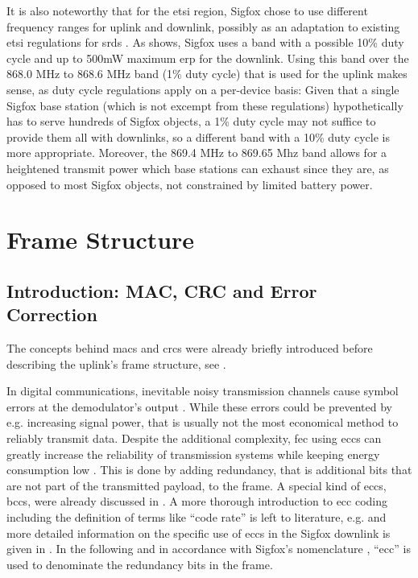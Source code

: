 It is also noteworthy that for the \gls{etsi} region, Sigfox chose to use different frequency ranges for uplink and downlink, possibly as an adaptation to existing \gls{etsi} regulations for \glspl{srd} \cite{bnetza_srd}.
As  shows, Sigfox uses a band with a possible 10\% duty cycle and up to 500mW maximum \gls{erp} for the downlink.
Using this band over the 868.0 MHz to 868.6 MHz band (1\% duty cycle) that is used for the uplink makes sense, as duty cycle regulations apply on a per-device basis:
Given that a single Sigfox base station (which is not excempt from these regulations) hypothetically has to serve hundreds of Sigfox objects, a 1\% duty cycle may not suffice to provide them all with downlinks, so a different band with a 10\% duty cycle is more appropriate.
Moreover, the 869.4 MHz to 869.65 Mhz band allows for a heightened transmit power which base stations can exhaust since they are, as opposed to most Sigfox objects, not constrained by limited battery power.

\FloatBarrier
\section{Frame Structure}
\label{sec:downlink_frameformat}
\subsection{Introduction: MAC, CRC and Error Correction}
\label{sec:downlink_frameformat_introduction}
The concepts behind \glspl{mac} and \glspl{crc} were already briefly introduced before describing the uplink's frame structure, see .

In digital communications, inevitable noisy transmission channels cause symbol errors at the demodulator's output \cite[Section 1.2.4]{ecctechniques}.
While these errors could be prevented by e.g. increasing signal power, that is usually not the most economical method to reliably transmit data.
Despite the additional complexity, \gls{fec} using \glspl{ecc} can greatly increase the reliability of transmission systems while keeping energy consumption low \cite[chapter 1, introduction]{ecctechniques}.
This is done by adding redundancy, that is additional bits that are not part of the transmitted payload, to the frame.
A special kind of \glspl{ecc}, \glspl{bcc}, were already discussed in .
A more thorough introduction to \gls{ecc} coding including the definition of terms like ``code rate'' is left to literature, e.g. \cite{ecctechniques} and more detailed information on the specific use of \glspl{ecc} in the Sigfox downlink is given in .
In the following and in accordance with Sigfox's nomenclature \cite{sigfox_ietf, rs_appnote}, ``\gls{ecc}'' is used to denominate the redundancy bits in the frame.

